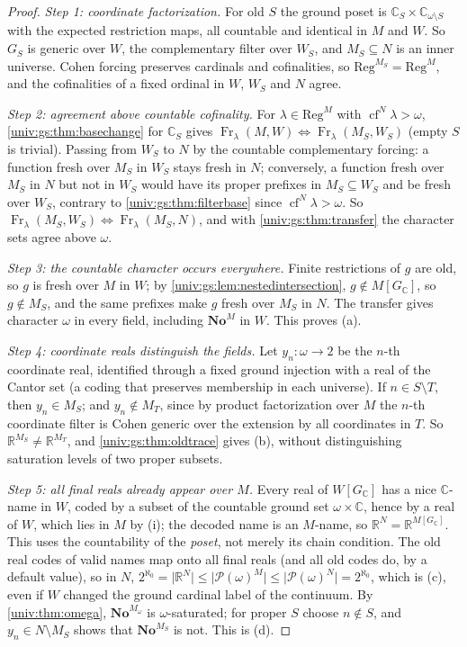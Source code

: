 \documentclass[11pt,letterpaper]{article}
\numberwithin{equation}{section}
\theoremstyle{definition}
\theoremstyle{remark}
\newcommand{\No}{\mathbf{No}}
\newcommand{\NoM}{\No^{M}}
\newcommand{\R}{\mathbb R}
\newcommand{\Pow}{\mathcal P}
\newcommand{\cf}{\operatorname{cf}}
\newcommand{\abs}[1]{\lvert#1\rvert}
\newcommand{\Fr}{\operatorname{Fr}}
\newcommand{\Reg}{\mathrm{Reg}}
\begin{document}
\begin{proof}
\emph{Step 1: coordinate factorization.} For old $S$ the ground poset is
$\mathbb C_S\times\mathbb C_{\omega\setminus S}$ with the expected restriction maps, all
countable and identical in $M$ and $W$. So $G_S$ is generic over $W$, the complementary filter
over $W_S$, and $M_S\subseteq N$ is an inner universe. Cohen forcing preserves cardinals and
cofinalities, so $\Reg^{M_S}=\Reg^M$, and the cofinalities of a fixed ordinal in $W$, $W_S$ and
$N$ agree.

\emph{Step 2: agreement above countable cofinality.} For $\lambda\in\Reg^M$ with
$\cf^N\lambda>\omega$, \cref{univ:gs:thm:basechange} for $\mathbb C_S$ gives
$\Fr_\lambda(M,W)\iff\Fr_\lambda(M_S,W_S)$ (empty $S$ is trivial). Passing from $W_S$ to $N$ by
the countable complementary forcing: a function fresh over $M_S$ in $W_S$ stays fresh in $N$;
conversely, a function fresh over $M_S$ in $N$ but not in $W_S$ would have its proper prefixes
in $M_S\subseteq W_S$ and be fresh over $W_S$, contrary to \cref{univ:gs:thm:filterbase} since
$\cf^N\lambda>\omega$. So $\Fr_\lambda(M_S,W_S)\iff\Fr_\lambda(M_S,N)$, and with
\cref{univ:gs:thm:transfer} the character sets agree above $\omega$.

\emph{Step 3: the countable character occurs everywhere.} Finite restrictions of $g$ are old,
so $g$ is fresh over $M$ in $W$; by \cref{univ:gs:lem:nestedintersection}, $g\notin
M[G_{\mathbb C}]$, so $g\notin M_S$, and the same prefixes make $g$ fresh over $M_S$ in $N$. The
transfer gives character $\omega$ in every field, including $\NoM$ in $W$. This proves (a).

\emph{Step 4: coordinate reals distinguish the fields.} Let $y_n:\omega\to2$ be the $n$-th
coordinate real, identified through a fixed ground injection with a real of the Cantor set (a
coding that preserves membership in each universe). If $n\in S\setminus T$, then $y_n\in M_S$;
and $y_n\notin M_T$, since by product factorization over $M$ the $n$-th coordinate filter is
Cohen generic over the extension by all coordinates in $T$. So $\R^{M_S}\ne\R^{M_T}$, and
\cref{univ:gs:thm:oldtrace} gives (b), without distinguishing saturation levels of two proper
subsets.

\emph{Step 5: all final reals already appear over $M$.} Every real of $W[G_{\mathbb C}]$ has a
nice $\mathbb C$-name in $W$, coded by a subset of the countable ground set
$\omega\times\mathbb C$, hence by a real of $W$, which lies in $M$ by (i); the decoded name is an
$M$-name, so $\R^N=\R^{M[G_{\mathbb C}]}$. This uses the countability of the \emph{poset}, not
merely its chain condition. The old real codes of valid names map onto all final reals (and
all old codes do, by a default value), so in $N$,
$2^{\aleph_0}=\abs{\R^N}\le\abs{\Pow(\omega)^M}\le\abs{\Pow(\omega)^N}=2^{\aleph_0}$, which is
(c), even if $W$ changed the ground cardinal label of the continuum. By
\cref{univ:thm:omega}, $\No^{M_\omega}$ is $\omega$-saturated; for proper $S$ choose $n\notin S$,
and $y_n\in N\setminus M_S$ shows that $\No^{M_S}$ is not. This is (d).


\end{proof}
\end{document}

